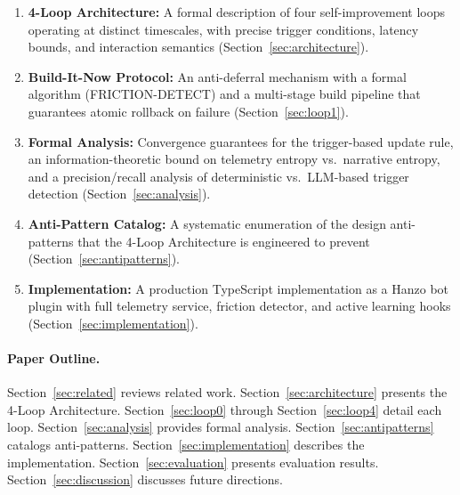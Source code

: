 \begin{enumerate}[leftmargin=1.5em]
    \item \textbf{4-Loop Architecture:} A formal description of four
          self-improvement loops operating at distinct timescales, with
          precise trigger conditions, latency bounds, and interaction semantics
          (Section~\ref{sec:architecture}).

    \item \textbf{Build-It-Now Protocol:} An anti-deferral mechanism with a
          formal algorithm (FRICTION-DETECT) and a multi-stage build pipeline
          that guarantees atomic rollback on failure
          (Section~\ref{sec:loop1}).

    \item \textbf{Formal Analysis:} Convergence guarantees for the
          trigger-based update rule, an information-theoretic bound on
          telemetry entropy vs.\ narrative entropy, and a precision/recall
          analysis of deterministic vs.\ LLM-based trigger detection
          (Section~\ref{sec:analysis}).

    \item \textbf{Anti-Pattern Catalog:} A systematic enumeration of the
          design anti-patterns that the 4-Loop Architecture is engineered to
          prevent (Section~\ref{sec:antipatterns}).

    \item \textbf{Implementation:} A production TypeScript implementation
          as a Hanzo bot plugin with full telemetry service, friction
          detector, and active learning hooks (Section~\ref{sec:implementation}).
\end{enumerate}

\paragraph{Paper Outline.}
Section~\ref{sec:related} reviews related work.
Section~\ref{sec:architecture} presents the 4-Loop Architecture.
Section~\ref{sec:loop0} through Section~\ref{sec:loop4} detail each loop.
Section~\ref{sec:analysis} provides formal analysis.
Section~\ref{sec:antipatterns} catalogs anti-patterns.
Section~\ref{sec:implementation} describes the implementation.
Section~\ref{sec:evaluation} presents evaluation results.
Section~\ref{sec:discussion} discusses future directions.

